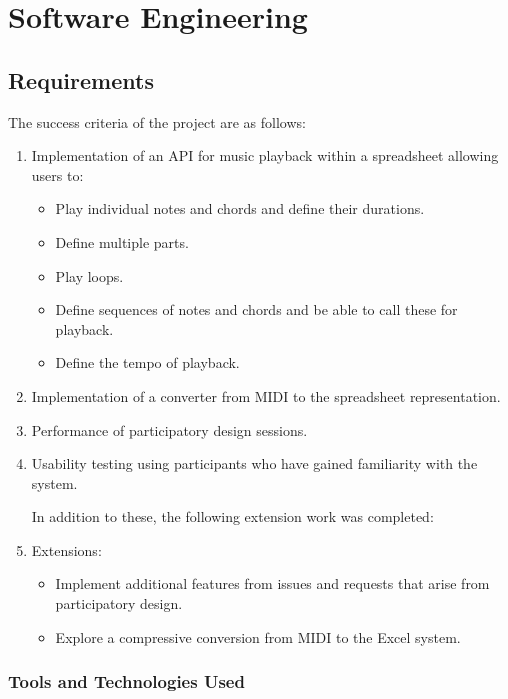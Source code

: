 \documentclass{article}
\begin{document}
\section{Software Engineering}

\subsection{Requirements}

The success criteria of the project are as follows:

\begin{enumerate}
  \item Implementation of an API for music playback within a spreadsheet allowing users to:
  \begin{itemize}
     \item Play individual notes and chords and define their durations.
     \item Define multiple parts.
     \item Play loops.
     \item Define sequences of notes and chords and be able to call these for playback.
     \item Define the tempo of playback.
   \end{itemize}
  \item Implementation of a converter from MIDI to the spreadsheet representation.
  \item Performance of participatory design sessions.
  \item Usability testing using participants who have gained familiarity with the system.

  In addition to these, the following extension work was completed:

  \item Extensions:
  \begin{itemize}
     \item Implement additional features from issues and requests that arise from participatory design.
     \item Explore a compressive conversion from MIDI to the Excel system.
   \end{itemize}
\end{enumerate}

\subsubsection{Tools and Technologies Used}
\end{document}
